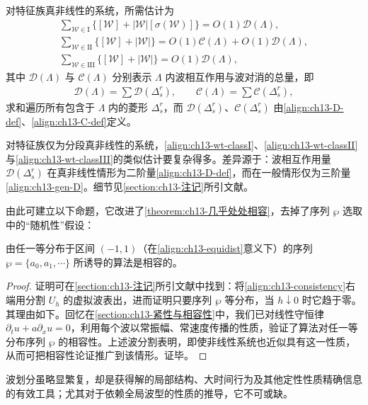 \documentclass[../../main.tex]{subfiles}
\begin{document}
对特征族真非线性的系统，所需估计为
\begin{align}
\sum_{\mathscr{W}\in\mathrm{I}}\big\{[\mathscr{W}]+|\mathscr{W}|[\sigma(\mathscr{W})]\big\}=O(1)\mathscr{D}(\Lambda),
\label{align:ch13-wt-classI}\\
\sum_{\mathscr{W}\in\mathrm{II}}\big\{[\mathscr{W}]+|\mathscr{W}|\big\}=O(1)\mathscr{C}(\Lambda)+O(1)\mathscr{D}(\Lambda),
\label{align:ch13-wt-classII}\\
\sum_{\mathscr{W}\in\mathrm{III}}\big\{[\mathscr{W}]+|\mathscr{W}|\big\}=O(1)\mathscr{D}(\Lambda),
\label{align:ch13-wt-classIII}
\end{align}
其中 $\mathscr{D}(\Lambda)$ 与 $\mathscr{C}(\Lambda)$ 分别表示 $\Lambda$ 内波相互作用与波对消的总量，即
\begin{align}
\mathscr{D}(\Lambda)=\sum\mathscr{D}(\Delta_s^r),\qquad
\mathscr{C}(\Lambda)=\sum\mathscr{C}(\Delta_s^r),
\label{align:ch13-wt-DC}
\end{align}
求和遍历所有包含于 $\Lambda$ 内的菱形 $\Delta_s^r$，而 $\mathscr{D}(\Delta_s^r)$、$\mathscr{C}(\Delta_s^r)$ 由\eqref{align:ch13-D-def}、\eqref{align:ch13-C-def}定义。

对特征族仅为分段真非线性的系统，\eqref{align:ch13-wt-classI}、\eqref{align:ch13-wt-classII}与\eqref{align:ch13-wt-classIII}的类似估计要复杂得多。差异源于：波相互作用量 $\mathscr{D}(\Delta_s^r)$ 在真非线性情形为二阶量\eqref{align:ch13-D-def}，而在一般情形仅为三阶量\eqref{align:ch13-gen-D}。细节见\cref{section:ch13-注记}所引文献。

由此可建立以下命题，它改进了\cref{theorem:ch13-几乎处处相容}，去掉了序列 $\wp$ 选取中的``随机性''假设：

\begin{theorem}[等分布序列的相容性]\label{theorem:ch13-等分布相容}
由任一等分布于区间 $(-1,1)$（在\eqref{align:ch13-equidist}意义下）的序列 $\wp=\{a_0,a_1,\cdots\}$ 所诱导的算法是相容的。
\end{theorem}

\begin{proof}
证明可在\cref{section:ch13-注记}所引文献中找到：将\eqref{align:ch13-consistency}右端用分割 $U_h$ 的虚拟波表出，进而证明只要序列 $\wp$ 等分布，当 $h\downarrow0$ 时它趋于零。其理由如下。回忆在\cref{section:ch13-紧性与相容性}中，我们已对线性守恒律 $\partial_t u+a\partial_x u=0$，利用每个波以常振幅、常速度传播的性质，验证了算法对任一等分布序列 $\wp$ 的相容性。上述波分割表明，即使非线性系统也近似具有这一性质，从而可把相容性论证推广到该情形。证毕。
\end{proof}

波划分虽略显繁复，却是获得解的局部结构、大时间行为及其他定性性质精确信息的有效工具；尤其对于依赖全局波型的性质的推导，它不可或缺。
\end{document}

